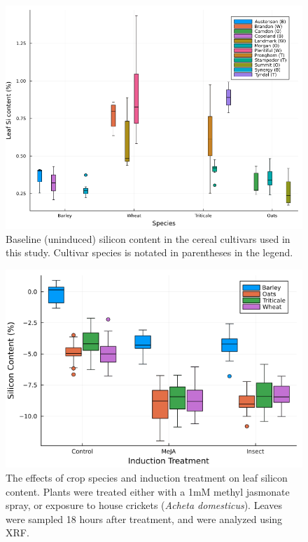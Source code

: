\documentclass[12pt, letterpaper, ]{report}
\begin{document}
\begin{figure}[h]
        \includegraphics[width = \textwidth]{images/spp_si_content.png}
        \centering
        \caption{Baseline (uninduced) silicon content in the cereal cultivars used in this study. Cultivar species is notated in parentheses in the legend.}
        \label{Fig:baseline_si}
\end{figure}

\begin{figure}[h]
        \includegraphics[width = \textwidth]{images/induction_plot.png}
        \centering
        \caption{The effects of crop species and induction treatment on leaf silicon content. Plants were treated either with a 1mM methyl jasmonate spray, or exposure to house crickets (\textit{Acheta domesticus}). Leaves were sampled 18 hours after treatment, and were analyzed using XRF.}
        \label{Fig:induction}
\end{figure}
\end{document}
